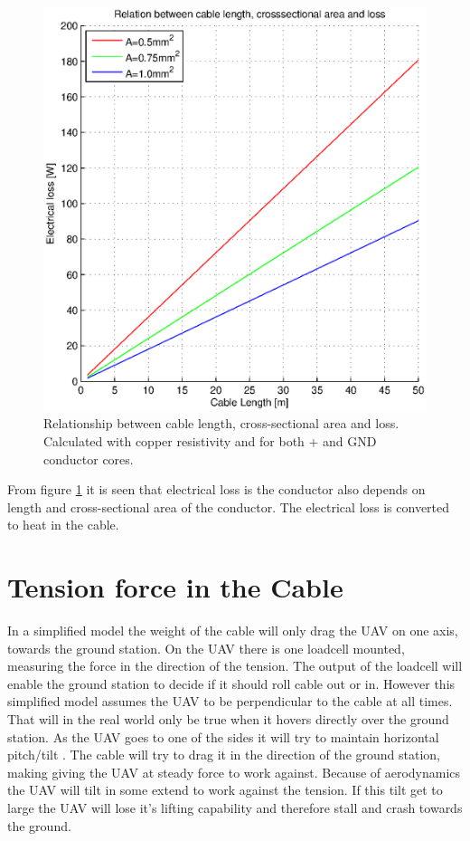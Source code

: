 \begin{figure}[H]
\centering
\includegraphics[scale=0.6]{graphics/matlab/cable_relation_lenght_loss_crosssection.eps}
\caption{Relationship between cable length, cross-sectional area and loss. Calculated with copper resistivity and for both + and GND conductor cores.}
\label{fig:relationship_loss_length}
\end{figure}

\noindent
From figure \ref{fig:relationship_loss_length} it is seen that electrical loss is the conductor also depends on length and cross-sectional area of the conductor. The electrical loss is converted to heat in the cable.


\section{Tension force in the Cable}
In a simplified model the weight of the cable will only drag the UAV on one axis, towards the ground station. On the UAV there is one loadcell mounted, measuring the force in the direction of the tension. The output of the loadcell will enable the ground station to decide if it should roll cable out or in. However this simplified model assumes the UAV to be perpendicular to the cable at all times. 
That will in the real world only be true when it hovers directly over the ground station. As the UAV goes to one of the sides it will try to maintain horizontal pitch/tilt . The cable will try to drag it in the direction of the ground station, making giving the UAV at steady force to work against. Because of aerodynamics the UAV will tilt in some extend to work against the tension. If this tilt get to large the UAV will lose it's lifting capability and therefore stall and crash towards the ground.   

